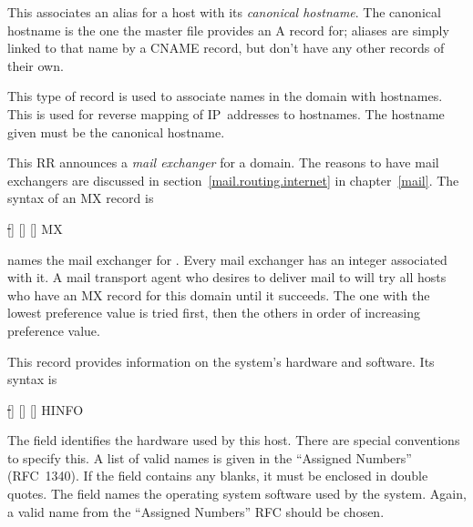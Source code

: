 \documentclass[11pt,makeidx]{report}
\def\emph#1{{\em{#1}}}
\begin{document}
{\begin{dispitems}
\ditem[CNAME]

This associates an alias for a host with its \emph{canonical hostname}.
The canonical hostname is the one the master file provides an A record
for; aliases are simply linked to that name by a CNAME record, but don't
have any other records of their own.


\ditem[PTR]

This type of record is used to associate names in the 
domain with hostnames. This is used for reverse mapping of IP~addresses
to hostnames. The hostname given must be the canonical hostname.


\ditem[MX]

This RR announces a \emph{mail exchanger} for a domain. The reasons to
have mail exchangers are discussed in section~\ref{mail.routing.internet}
in chapter~\ref{mail}.  The syntax of an MX record is


\begin{screen}\st
[] [] [] MX  
\end{screen}


 names the mail exchanger for . Every
mail exchanger has an integer  associated with it.
A mail transport agent who desires to deliver mail to 
will try all hosts who have an MX record for this domain
until it succeeds. The one with the lowest preference value is
tried first, then the others in order of increasing preference
value.




\ditem[HINFO]
This record provides information on the system's hardware
and software. Its syntax is


\begin{screen}\st
[] [] [] HINFO 
\end{screen}


The  field identifies the hardware used by this host.
There are special conventions to specify this. A list of valid names is
given in the ``Assigned Numbers'' (RFC~1340). If the field contains any
blanks, it must be enclosed in double quotes.  The  field
names the operating system software used by the system. Again, a valid
name from the ``Assigned Numbers'' RFC should be chosen.
\end{dispitems}
}
\end{document}

